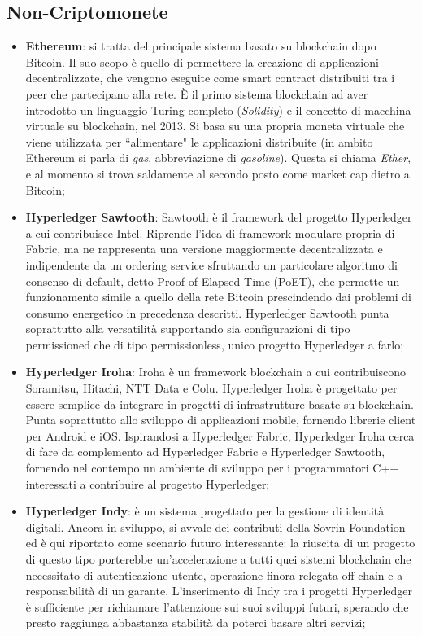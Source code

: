     \subsection{Non-Criptomonete} \label{sec:non-crypto}
        \begin{itemize}
            \item \textbf{Ethereum}: si tratta del principale sistema basato su blockchain dopo Bitcoin. Il suo scopo è quello di permettere la creazione di applicazioni decentralizzate, che vengono eseguite come smart contract distribuiti tra i peer che partecipano alla rete. È il primo sistema blockchain ad aver introdotto un linguaggio Turing-completo (\emph{Solidity}) e il concetto di macchina virtuale su blockchain, nel 2013. Si basa su una propria moneta virtuale che viene utilizzata per ``alimentare" le applicazioni distribuite (in ambito Ethereum si parla di \emph{gas}, abbreviazione di \emph{gasoline}). Questa si chiama \emph{Ether}, e al momento si trova saldamente al secondo posto come market cap dietro a Bitcoin;
            \item \textbf{Hyperledger Sawtooth}: Sawtooth è il framework del progetto Hyperledger a cui contribuisce Intel. Riprende l'idea di framework modulare propria di Fabric, ma ne rappresenta una versione maggiormente decentralizzata e indipendente da un ordering service sfruttando un particolare algoritmo di consenso di default, detto Proof of Elapsed Time (PoET), che permette un funzionamento simile a quello della rete Bitcoin prescindendo dai problemi di consumo energetico in precedenza descritti. Hyperledger Sawtooth punta soprattutto alla versatilità supportando sia configurazioni di tipo permissioned che di tipo permissionless, unico progetto Hyperledger a farlo;
            \item \textbf{Hyperledger Iroha}: Iroha è un framework blockchain a cui contribuiscono Soramitsu, Hitachi, NTT Data e Colu. Hyperledger Iroha è progettato per essere semplice da integrare in progetti di infrastrutture basate su blockchain. Punta soprattutto allo sviluppo di applicazioni mobile, fornendo librerie client per Android e iOS. Ispirandosi a Hyperledger Fabric, Hyperledger Iroha cerca di fare da complemento ad Hyperledger Fabric e Hyperledger Sawtooth, fornendo nel contempo un ambiente di sviluppo per i programmatori C++ interessati a contribuire al progetto Hyperledger;
            \item \textbf{Hyperledger Indy}: è un sistema progettato per la gestione di identità digitali. Ancora in sviluppo, si avvale dei contributi della Sovrin Foundation ed è qui riportato come scenario futuro interessante: la riuscita di un progetto di questo tipo porterebbe un'accelerazione a tutti quei sistemi blockchain che necessitato di autenticazione utente, operazione finora relegata off-chain e a responsabilità di un garante. L'inserimento di Indy tra i progetti Hyperledger è sufficiente per richiamare l'attenzione sui suoi sviluppi futuri, sperando che presto raggiunga abbastanza stabilità da poterci basare altri servizi;

\end{itemize}
